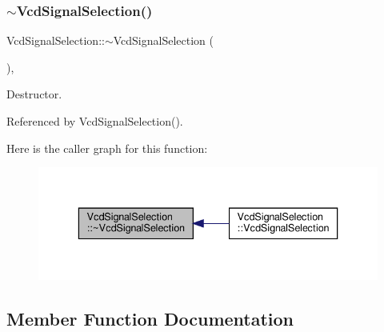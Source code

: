 \subsubsection{\texorpdfstring{$\sim$\+Vcd\+Signal\+Selection()}{~VcdSignalSelection()}}
{\footnotesize\ttfamily Vcd\+Signal\+Selection\+::$\sim$\+Vcd\+Signal\+Selection (\begin{DoxyParamCaption}{ }\end{DoxyParamCaption})\hspace{0.3cm}{\ttfamily [override]}, {\ttfamily [default]}}



Destructor. 



Referenced by Vcd\+Signal\+Selection().

Here is the caller graph for this function\+:
\nopagebreak
\begin{figure}[H]
\begin{center}
\leavevmode
\includegraphics[width=336pt]{dd/de4/classVcdSignalSelection_af3b73d8ddec404bf3909f58ece570b79_icgraph}
\end{center}
\end{figure}


\subsection{Member Function Documentation}
\mbox{\label{classVcdSignalSelection_ae6f9acf47344a58c2d762308d3d0c97f}} 
